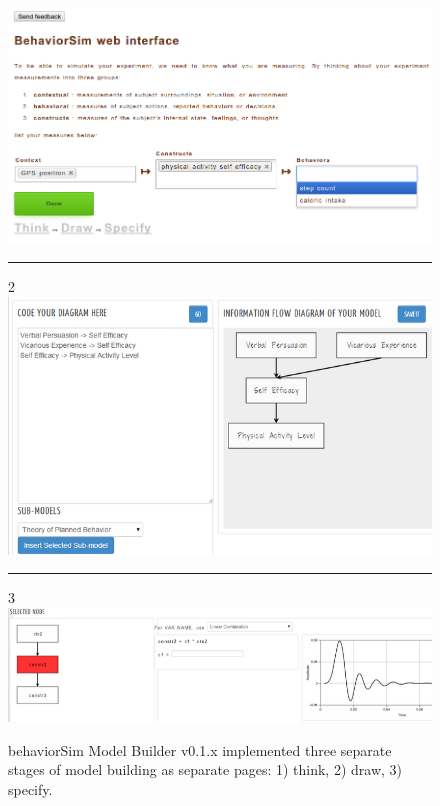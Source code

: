 \documentclass[conference]{IEEEtran}
\begin{document}
\begin{figure}[!t]
  \includegraphics[width=0.9\columnwidth]{img/v1-think}
  \rule{\columnwidth}{0.4pt}
  2
  \includegraphics[width=0.9\columnwidth]{img/v1-draw}
  \rule{\columnwidth}{0.4pt}
  3
  \includegraphics[width=0.9\columnwidth]{img/v1-specify}  
  \caption{behaviorSim Model Builder v0.1.x implemented three separate stages of model building as separate pages: 1) think, 2) draw, 3) specify.}
  \label{model-builder-v1}
\end{figure}
\end{document}

